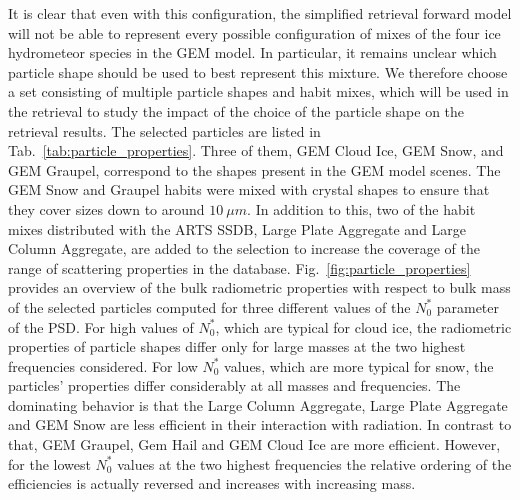 \documentclass[journal abbreviation, manuscript]{copernicus}
\begin{document}
It is clear that even with this configuration, the simplified retrieval forward
model will not be able to represent every possible configuration of mixes of the
four ice hydrometeor species in the GEM model. In particular, it remains unclear
which particle shape should be used to best represent this mixture. We therefore
choose a set consisting of multiple particle shapes and habit mixes, which will
be used in the retrieval to study the impact of the choice of the particle shape
on the retrieval results. The selected particles are listed in
Tab.~\ref{tab:particle_properties}. Three of them, GEM Cloud Ice, GEM Snow, and
GEM Graupel, correspond to the shapes present in the GEM model scenes. The GEM
Snow and Graupel habits were mixed with crystal shapes to ensure that they cover
sizes down to around $10\ \unit{\mu m}$. In addition to this, two of the habit
mixes distributed with the ARTS SSDB, Large Plate Aggregate and Large Column
Aggregate, are added to the selection to increase the coverage of the range of
scattering properties in the database. Fig.~\ref{fig:particle_properties}
provides an overview of the bulk radiometric properties with respect to bulk
mass of the selected particles computed for three different values of the
$N_0^*$ parameter of the PSD. For high values of $N_0^*$, which are typical for
cloud ice, the radiometric properties of particle shapes differ only for large
masses at the two highest frequencies considered. For low $N_0^*$ values, which
are more typical for snow, the particles' properties differ considerably at all
masses and frequencies. The dominating behavior is that the Large Column
Aggregate, Large Plate Aggregate and GEM Snow are less efficient in their
interaction with radiation. In contrast to that, GEM Graupel, Gem Hail and GEM
Cloud Ice are more efficient. However, for the lowest $N_0^*$ values at
the two highest frequencies the relative ordering of the efficiencies is
actually reversed and increases with increasing mass.
\end{document}
